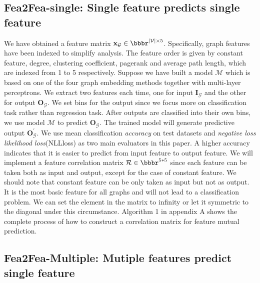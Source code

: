 \documentclass[runningheads]{llncs}
\newcommand{\xhdr}[1]{\vspace{1.7mm}\noindent{{\bf #1}}}
\begin{document}
\vspace{-1.2cm}
\subsection{Fea2Fea-single: Single feature predicts single feature}
\xhdr{Obtain a correlation matrix by GNN} We have obtained a feature matrix $\textbf{x}_{\mathcal G} \in  \bbbr^{|\mathcal{V}|\times 5}$. Specifically, graph features
have been indexed to simplify analysis. The feature order is given by constant feature, degree, clustering coefficient, pagerank and 
average path length, which are indexed from 1 to 5 respectively. Suppose we have built 
a model $\mathcal M$ which is based on one of the four graph embedding methods together with multi-layer perceptrons. We extract two features each time, one
for input $\textbf{I}_{\mathcal G}$ and the other for output $\textbf{O}_{\mathcal G}$. We set bins for the output
since we focus more on classification task rather than regression task. After outputs are classified into their own bins, we use model $\mathcal M$ to predict $\textbf{O}_{\mathcal G}$. The trained model 
will generate predictive output $\textbf{O}^{'}_{\mathcal G}$.  We use mean classification \textit{accuracy} on test datasets and \textit{negative loss likelihood loss}(NLLloss) as two main evaluators in this paper. 
A higher accuracy indicates that it is easier to predict from input feature to output feature. 
We will implement a feature correlation matrix $\mathcal R \in \bbbr^{5 * 5}$ since each feature can be taken both as input and output, except for the case of constant feature. We should note that constant feature can 
be only taken as input but not as output. It is the most basic feature for all graphs and will not lead to a 
classification problem. We can set the element in the matrix to infinity or let it symmetric to the  diagonal under this circumstance. Algorithm 1 in appendix A shows the complete process of how to construct a correlation matrix for feature mutual prediction. 
\vspace{-0.45cm}
\subsection{Fea2Fea-Multiple: Mutiple features predict single feature}
\end{document}
